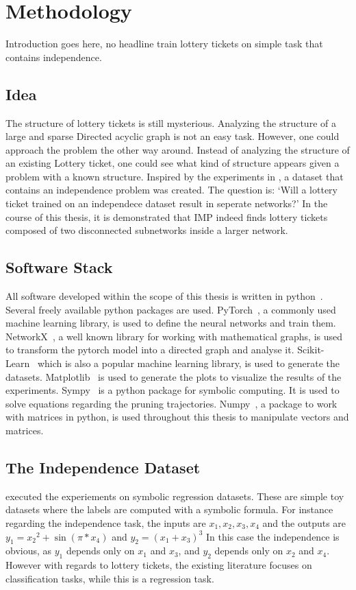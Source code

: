 \chapter{Methodology}
Introduction goes here, no headline
train lottery tickets on simple task that contains independence.

\section{Idea}
The structure of lottery tickets is still mysterious. 
Analyzing the structure of a large and sparse Directed acyclic graph is not an easy task. 
However, one could approach the problem the other way around. 
Instead of analyzing the structure of an existing Lottery ticket, one could see what kind of structure appears given a problem with a known structure.
Inspired by the experiments in \autocite{BIMT}, a dataset that contains an independence problem was created.
The question is:
`Will a lottery ticket trained on an independece dataset result in seperate networks?'
In the course of this thesis, it is demonstrated that IMP indeed finds lottery tickets composed of two disconnected subnetworks inside a larger network.

\section{Software Stack}
All software developed within the scope of this thesis is written in python~\autocite{python}.
Several freely available python packages are used.
PyTorch~\autocite{pytorch}, a commonly used machine learning library, is used to define the neural networks and train them.
NetworkX~\autocite{networkx}, a well known library for working with mathematical graphs, is used to transform the pytorch model into a directed graph and analyse it.
Scikit-Learn~\autocite{sklearn} which is also a popular machine learning library, is used to generate the datasets.
Matplotlib~\autocite{matplotlib} is used to generate the plots to visualize the results of the experiments.
Sympy~\autocite{sympy} is a python package for symbolic computing. It is used to solve equations regarding the pruning trajectories.
Numpy~\autocite{numpy}, a package to work with matrices in python, is used throughout this thesis to manipulate vectors and matrices.

\section{The Independence Dataset}\label{sec:independece_dataset}
\textcite{BIMT} executed the experiements on symbolic regression datasets.
These are simple toy datasets where the labels are computed with a symbolic formula. 
For instance regarding the independence task, the inputs are $x_1, x_2, x_3, x_4$ and the outputs are $y_1={x_2}^2 + \sin{(\pi*x_4)}$ and $y_2=(x_1+x_3)^3$
In this case the independence is obvious, as $y_1$ depends only on $x_1$ and $x_3$, and $y_2$ depends only on $x_2$ and $x_4$.
However with regards to lottery tickets, the existing literature focuses on classification tasks, while this is a regression task.

